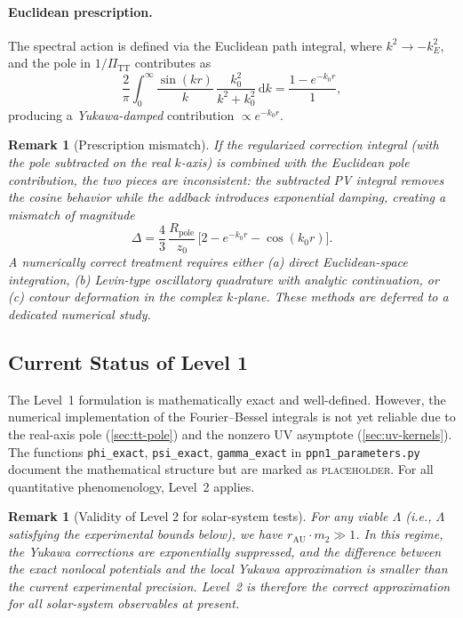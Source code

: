\documentclass[11pt,a4paper]{article}
\newcommand{\dd}{\mathrm{d}}
\newcommand{\PiTT}{\Pi_{\mathrm{TT}}}
\newtheorem{remark}[theorem]{Remark}
\begin{document}
\paragraph{Euclidean prescription.}
The spectral action is defined via the Euclidean path integral, where
$k^2 \to -k_E^2$, and the pole in $1/\PiTT$ contributes as
\begin{equation}\label{eq:euclidean}
  \frac{2}{\pi}\int_0^\infty
  \frac{\sin(kr)}{k}\,\frac{k_0^2}{k^2 + k_0^2}\,\dd k
  = \frac{1 - e^{-k_0 r}}{1},
\end{equation}
producing a \emph{Yukawa-damped} contribution $\propto e^{-k_0 r}$.

\begin{remark}[Prescription mismatch]
\label{rem:mismatch}
If the regularized correction integral (with the pole subtracted on the
real $k$-axis) is combined with the Euclidean pole contribution, the two
pieces are \emph{inconsistent}: the subtracted PV integral removes the
cosine behavior while the addback introduces exponential damping, creating
a mismatch of magnitude
\begin{equation}
  \Delta = \frac{4}{3}\,\frac{R_{\mathrm{pole}}}{z_0}\,
  \bigl[2 - e^{-k_0 r} - \cos(k_0 r)\bigr].
\end{equation}
A numerically correct treatment requires either (a) direct
Euclidean-space integration, (b) Levin-type oscillatory quadrature with
analytic continuation, or (c) contour deformation in the complex
$k$-plane.  These methods are deferred to a dedicated numerical study.
\end{remark}

\subsection{Current Status of Level 1}

The Level~1 formulation is mathematically exact and well-defined.
However, the numerical implementation of the Fourier--Bessel integrals
is not yet reliable due to the real-axis pole (\cref{sec:tt-pole}) and
the nonzero UV asymptote (\cref{sec:uv-kernels}).  The functions
\texttt{phi\_exact}, \texttt{psi\_exact}, \texttt{gamma\_exact} in
\texttt{ppn1\_parameters.py} document the mathematical structure but are
marked as \textsc{placeholder}.  For all quantitative phenomenology,
Level~2 applies.

\begin{remark}[Validity of Level 2 for solar-system tests]
For any viable $\Lambda$ (i.e., $\Lambda$ satisfying the experimental
bounds below), we have $r_\mathrm{AU}\cdot m_2 \gg 1$.  In this regime,
the Yukawa corrections are exponentially suppressed, and the difference
between the exact nonlocal potentials and the local Yukawa approximation
is smaller than the current experimental precision.  Level~2 is therefore
the correct approximation for all solar-system observables at present.
\end{remark}
\end{document}
